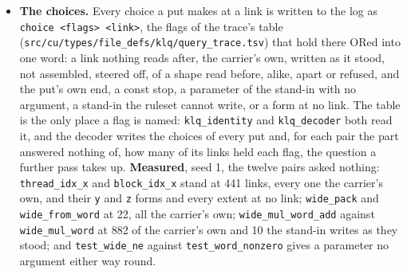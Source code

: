 \begin{itemize}
\item \textbf{The choices.} Every choice a put makes at a link is written to the log as \texttt{choice <flags> <link>}, the flags of the trace's table (\texttt{src/\allowbreak{}cu/\allowbreak{}types/\allowbreak{}file\_\allowbreak{}defs/\allowbreak{}klq/\allowbreak{}query\_\allowbreak{}trace.\allowbreak{}tsv}) that hold there ORed into one word: a link nothing reads after, the carrier's own, written as it stood, not assembled, steered off, of a shape read before, alike, apart or refused, and the put's own end, a const stop, a parameter of the stand-in with no argument, a stand-in the ruleset cannot write, or a form at no link. The table is the only place a flag is named: \texttt{klq\_\allowbreak{}identity} and \texttt{klq\_\allowbreak{}decoder} both read it, and the decoder writes the choices of every put and, for each pair the part answered nothing of, how many of its links held each flag, the question a further pass takes up. \textbf{Measured}, seed 1, the twelve pairs asked nothing: \texttt{thread\_\allowbreak{}idx\_\allowbreak{}x} and \texttt{block\_\allowbreak{}idx\_\allowbreak{}x} stand at 441 links, every one the carrier's own, and their \texttt{y} and \texttt{z} forms and every extent at no link; \texttt{wide\_\allowbreak{}pack} and \texttt{wide\_\allowbreak{}from\_\allowbreak{}word} at 22, all the carrier's own; \texttt{wide\_\allowbreak{}mul\_\allowbreak{}word\_\allowbreak{}add} against \texttt{wide\_\allowbreak{}mul\_\allowbreak{}word} at 882 of the carrier's own and 10 the stand-in writes as they stood; and \texttt{test\_\allowbreak{}wide\_\allowbreak{}ne} against \texttt{test\_\allowbreak{}word\_\allowbreak{}nonzero} gives a parameter no argument either way round.

\end{itemize}
